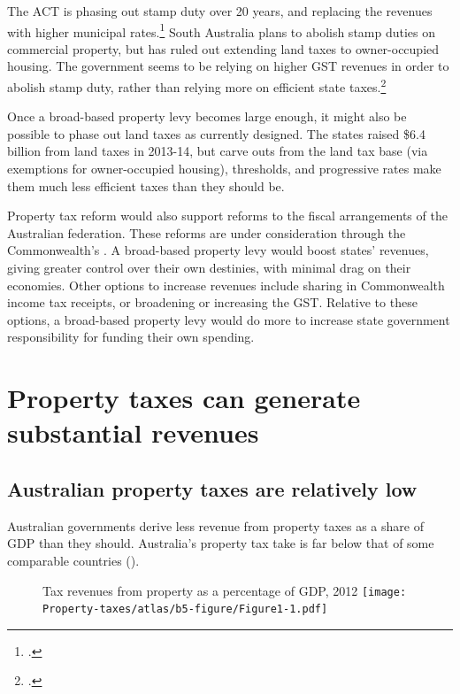 \documentclass[twoside,english]{Dianab5ona4portrait}
\begin{document}
The ACT is phasing out stamp duty over 20 years, and replacing the revenues with higher municipal rates.\footcites[][21]{ACT-Treasury2012-13-Budget-Papers}[][229]{ACT-Treasury2014-15-Budget-Papers}  South Australia plans to abolish stamp duties on commercial property, but has ruled out extending land taxes to owner-occupied housing. The government seems to be relying on higher GST revenues in order to abolish stamp duty, rather than relying more on efficient state taxes.\footcites{GovernmentSouthAustralia2015-Govt-response-to-State-Tax-Review}{DTF2015-State-Budget-Papers-201516} 

Once a broad-based property levy becomes large enough, it might also be possible to phase out land taxes as currently designed. The states raised \$6.4 billion from land taxes in 2013-14, but carve outs from the land tax base (via exemptions for owner-occupied housing), thresholds, and progressive rates make them much less efficient taxes than they should be. 

Property tax reform would also support reforms to the fiscal arrangements of the Australian federation. These reforms are under consideration through the Commonwealth’s 
.
A broad-based property levy would boost states’ revenues, giving greater control over their own destinies, with minimal drag on their economies. Other options to increase revenues include sharing in Commonwealth income tax receipts, or broadening or increasing the GST\@. Relative to these options, a broad-based property levy would do more to increase state government responsibility for funding their own spending. 


\chapter{Property taxes can generate substantial revenues}\label{chapter:PROP-3}
\section{Australian property taxes are relatively low}
Australian governments derive less revenue from property taxes as a share of GDP than they should. Australia’s property tax take is far below that of some comparable countries ().

\begin{figure}[hb]
%
{Tax revenues from property as a percentage of GDP, 2012}
\texttt{[image: Property-taxes/atlas/b5-figure/Figure1-1.pdf]}

\end{figure}
\oneraggedpage
\end{document}
